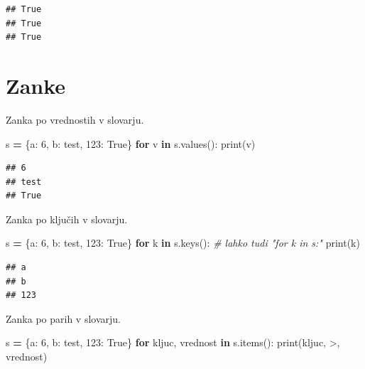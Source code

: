 \documentclass[
]{book}
\newenvironment{Shaded}{\begin{snugshade}}{\end{snugshade}}
\newcommand{\BuiltInTok}[1]{#1}
\newcommand{\CommentTok}[1]{\textcolor[rgb]{0.56,0.35,0.01}{\textit{#1}}}
\newcommand{\ControlFlowTok}[1]{\textcolor[rgb]{0.13,0.29,0.53}{\textbf{#1}}}
\newcommand{\DecValTok}[1]{\textcolor[rgb]{0.00,0.00,0.81}{#1}}
\newcommand{\KeywordTok}[1]{\textcolor[rgb]{0.13,0.29,0.53}{\textbf{#1}}}
\newcommand{\NormalTok}[1]{#1}
\newcommand{\OperatorTok}[1]{\textcolor[rgb]{0.81,0.36,0.00}{\textbf{#1}}}
\newcommand{\StringTok}[1]{\textcolor[rgb]{0.31,0.60,0.02}{#1}}
\newcommand{\VariableTok}[1]{\textcolor[rgb]{0.00,0.00,0.00}{#1}}
\begin{document}
\begin{verbatim}
## True
## True
## True
\end{verbatim}

\hypertarget{zanke-1}{%
\section{Zanke}\label{zanke-1}}

Zanka po vrednostih v slovarju.

\begin{Shaded}
\begin{Highlighting}[]
\NormalTok{s }\OperatorTok{=}\NormalTok{ \{}\StringTok{\textquotesingle{}a\textquotesingle{}}\NormalTok{: }\DecValTok{6}\NormalTok{, }\StringTok{\textquotesingle{}b\textquotesingle{}}\NormalTok{: }\StringTok{\textquotesingle{}test\textquotesingle{}}\NormalTok{, }\DecValTok{123}\NormalTok{: }\VariableTok{True}\NormalTok{\}}
\ControlFlowTok{for}\NormalTok{ v }\KeywordTok{in}\NormalTok{ s.values():}
    \BuiltInTok{print}\NormalTok{(v)}
\end{Highlighting}
\end{Shaded}

\begin{verbatim}
## 6
## test
## True
\end{verbatim}

Zanka po ključih v slovarju.

\begin{Shaded}
\begin{Highlighting}[]
\NormalTok{s }\OperatorTok{=}\NormalTok{ \{}\StringTok{\textquotesingle{}a\textquotesingle{}}\NormalTok{: }\DecValTok{6}\NormalTok{, }\StringTok{\textquotesingle{}b\textquotesingle{}}\NormalTok{: }\StringTok{\textquotesingle{}test\textquotesingle{}}\NormalTok{, }\DecValTok{123}\NormalTok{: }\VariableTok{True}\NormalTok{\}}
\ControlFlowTok{for}\NormalTok{ k }\KeywordTok{in}\NormalTok{ s.keys(): }\CommentTok{\# lahko tudi "for k in s:"}
    \BuiltInTok{print}\NormalTok{(k)}
\end{Highlighting}
\end{Shaded}

\begin{verbatim}
## a
## b
## 123
\end{verbatim}

Zanka po parih v slovarju.

\begin{Shaded}
\begin{Highlighting}[]
\NormalTok{s }\OperatorTok{=}\NormalTok{ \{}\StringTok{\textquotesingle{}a\textquotesingle{}}\NormalTok{: }\DecValTok{6}\NormalTok{, }\StringTok{\textquotesingle{}b\textquotesingle{}}\NormalTok{: }\StringTok{\textquotesingle{}test\textquotesingle{}}\NormalTok{, }\DecValTok{123}\NormalTok{: }\VariableTok{True}\NormalTok{\}}
\ControlFlowTok{for}\NormalTok{ kljuc, vrednost }\KeywordTok{in}\NormalTok{ s.items():}
    \BuiltInTok{print}\NormalTok{(kljuc, }\StringTok{\textquotesingle{}{-}\textgreater{}\textquotesingle{}}\NormalTok{, vrednost)}
\end{Highlighting}
\end{Shaded}
\end{document}
